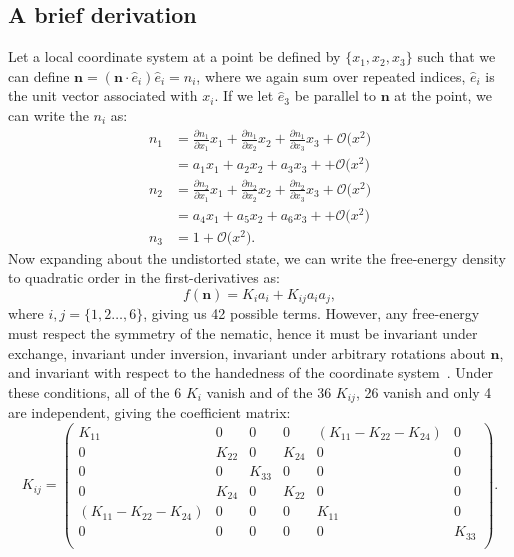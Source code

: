 \subsection{A brief derivation}
Let a local coordinate system at a point be defined by $\{x_1, x_2, x_3 \}$ such that we can define $\mathbf{n} = (\mathbf{n} \cdot \hat{e}_i) \hat{e}_i = n_i$, where we again sum over repeated indices, $\hat{e}_i$ is the unit vector associated with $x_i$.
If we let $\hat{e}_3$ be parallel to $\mathbf{n}$ at the point, we can write the $n_i$ as:
\label{e:2-LocalCoord}
\begin{align}
  n_1 &= \frac{\partial n_1}{\partial x_1}x_1 + \frac{\partial n_1}{\partial x_2}x_2 + \frac{\partial n_1}{\partial x_3}x_3 + \mathcal{O}\big (x^2 \big ) \nonumber \\
      &= a_1 x_1 + a_2 x_2 + a_3 x_3 + + \mathcal{O}\big (x^2 \big )\tag{\theequation a}\label{e:2-LocalCoordA}  \\
  n_2 &= \frac{\partial n_2}{\partial x_1}x_1 + \frac{\partial n_2}{\partial x_2}x_2 + \frac{\partial n_2}{\partial x_3}x_3 + \mathcal{O}\big (x^2 \big ) \nonumber  \\
      &= a_4 x_1 + a_5 x_2 + a_6 x_3 + + \mathcal{O}\big (x^2 \big )\tag{\theequation b}\label{e:2-LocalCoordB}  \\
  n_3 &= 1 + \mathcal{O}\big (x^2 \big ). \nonumber
\end{align}
Now expanding about the undistorted state, we can write the free-energy density to quadratic order in the first-derivatives as:
\begin{equation}
  f(\mathbf{n}) = K_i a_i + K_{ij} a_i a_j,\label{e:2-FrankGeneralExpansion}
\end{equation}
where $i,j = \{ 1,2 \dots, 6 \}$, giving us 42 possible terms.
However, any free-energy must respect the symmetry of the nematic, hence it must be invariant under exchange, invariant under inversion, invariant under arbitrary rotations about $\mathbf{n}$, and invariant with respect to the handedness of the coordinate system~\cite{RN61}.
Under these conditions, all of the 6 $K_i$ vanish and of the 36 $K_{ij}$, 26 vanish and only 4 are independent, giving the coefficient matrix:
\begin{equation}
  K_{ij} =
  \begin{pmatrix}
    K_{11} & 0 & 0 & 0 & (K_{11}-K_{22}-K_{24}) & 0 \\
    0 & K_{22} & 0 & K_{24} & 0 & 0 \\
    0 & 0 & K_{33} & 0 & 0 & 0 \\
    0 & K_{24} & 0 & K_{22} & 0 & 0 \\
    (K_{11}-K_{22}-K_{24}) & 0 & 0 & 0 & K_{11} & 0 \\
    0 & 0 & 0 & 0 & 0 & K_{33} \\
  \end{pmatrix}.
\end{equation}
